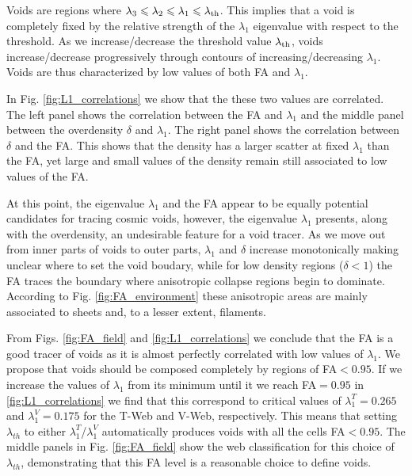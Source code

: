 \documentclass[a4,useAMS,usenatbib,usegraphicx]{mn2e}
\begin{document}
Voids are regions where $\lambda_3\leq\lambda_2\leq
\lambda_1\leq\lambda_{\rm th}$. 
This implies that a void is completely fixed by the relative strength
of the $\lambda_1$ eigenvalue with respect to the threshold.   
As we increase/decrease the threshold value $\lambda_{\rm th}$, voids
increase/decrease progressively through contours of
increasing/decreasing $\lambda_1$.  
Voids are thus characterized by low values of both FA and
$\lambda_1$.  


In Fig. \ref{fig:L1_correlations}  we show that the these two values
are correlated. 
The left panel shows the correlation between the FA and $\lambda_1$
and the middle panel between the overdensity $\delta$ and $\lambda_1$.
The right panel shows the correlation between $\delta$ and the
FA. 
This shows that the  density has a larger scatter at fixed
$\lambda_1$ than the FA, yet large and  small values of the density
remain still associated to low values of the FA. 


At this point, the eigenvalue $\lambda_1$ and the FA appear to be
equally potential candidates for tracing cosmic voids, however, the 
eigenvalue $\lambda_1$ presents, along with the overdensity, an undesirable 
feature for a void tracer. 
As we move out from inner parts of voids to outer parts, $\lambda_1$
and $\delta$ increase monotonically making unclear where to set the
void boudary, while for low density regions ($\delta<1$) the FA traces
the boundary where anisotropic collapse regions begin to 
dominate.
According to Fig. \ref{fig:FA_environment} these anisotropic areas are
mainly associated to sheets and, to a lesser extent, filaments.

From Figs. \ref{fig:FA_field} and \ref{fig:L1_correlations} we
conclude that the FA is a good tracer of voids as it is almost perfectly
correlated with low values of $\lambda_1$. 
We propose that voids should be composed completely by regions of
FA$<0.95$.
If we increase the values of $\lambda_1$ from its minimum until it
we reach FA$=0.95$ in \ref{fig:L1_correlations} we find that this
correspond to critical values of $\lambda_{1}^T = 0.265$ and
$\lambda_{1}^V = 0.175$ for the T-Web and V-Web, respectively.
This means that setting $\lambda_{th}$ to either
$\lambda_{1}^T$/$\lambda_{1}^{V}$ automatically produces voids with
all the cells FA$<0.95$.   
The middle panels in Fig. \ref{fig:FA_field} show the web
classification for this choice of $\lambda_{th}$, demonstrating that
this FA level is a reasonable choice to define voids.

   
\end{document}
